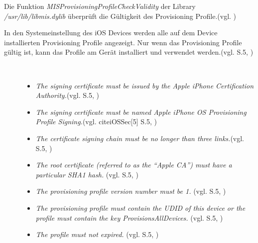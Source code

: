 Die Funktion \textit{\glqq MISProvisioningProfileCheckValidity\grqq{}} der Library \textit{\glqq /usr/lib/libmis.dylib\grqq{}} überprüft die Gültigkeit des Provisioning Profile.(vgl. \cite{Cache[1]}) \par
 In den Systemeinstellung des iOS Devices werden alle auf dem Device installierten Provisioning Profile angezeigt. Nur wenn das Provisioning Profile gültig ist, kann das Profile am Gerät installiert und verwendet werden.(vgl. \cite{iOSSec[5]} S.5, \cite{AppDist[1], Hacking[1]}) \par

\begin{description}
    \item[\parbox{\textwidth} {Ein Provisioning Profile ist nur gültig, wenn die folgenden Konditionen eingehalten werden}]~\par
    \begin{itemize}
        \item \glqq \textit{The signing certificate must be issued by the Apple iPhone Certification Authority.}\grqq{}(vgl. \cite{iOSSec[5]} S.5, \cite{Hacking[1]})    
    
        \item  \glqq \textit{The signing certificate must be named Apple iPhone OS Provisioning Profile Signing.}\grqq{}(vgl. cite{iOSSec[5]} S.5, \cite{Hacking[1]})
    
        \item  \glqq \textit{The certificate signing chain must be no longer than three links.}\grqq{}(vgl. \cite{iOSSec[5]} S.5, \cite{Hacking[1]})     
    
        \item  \glqq \textit{The root certificate (referred to as the “Apple CA”) must have a particular SHA1 hash.}\grqq{} (vgl. \cite{iOSSec[5]} S.5, \cite{Hacking[1]})    
    
        \item  \glqq \textit{The provisioning profile version number must be 1.}\grqq{} (vgl. \cite{iOSSec[5]} S.5, \cite{Hacking[1]})
    
        \item  \glqq \textit{The provisioning profile must contain the UDID of this device or the profile must contain the key ProvisionsAllDevices.}\grqq{} (vgl. \cite{iOSSec[5]} S.5, \cite{Hacking[1]})    
    
        \item  \glqq \textit{The profile must not expired.}\grqq{} (vgl.\cite{iOSSec[5]} S.5, \cite{Hacking[1]})
    \end{itemize}
\end{description} 


